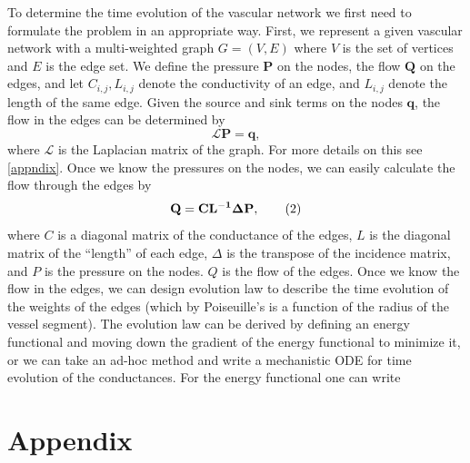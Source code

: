 \documentclass[10pt,a4paper,twocolumn]{article}
\begin{document}
	
	To determine the time evolution of the vascular network we first need to formulate the problem in an appropriate way. First, we represent a given vascular network with a multi-weighted graph $ G=(V,E) $ where $ V $ is the set of vertices and $ E $ is the edge set. We define the pressure $ \mathbf{P} $ on the nodes, the flow $ \mathbf{Q} $ on the edges, and let $ C_{i,j}, L_{i,j} $ denote the conductivity of an edge, and $ L_{i,j} $ denote the length of the same edge. Given the source and sink terms on the nodes $ \mathbf{q} $, the flow in the edges can be determined by
	\[ \mathcal{L} \mathbf{P} = \mathbf{q}, \]
	where $ \mathcal{L} $ is the Laplacian matrix of the graph. For more details on this see \autoref{appndix}. Once we know the pressures on the nodes, we can easily calculate the flow through the edges by 
	\[ \bf{Q} = \bf{C} L^{-1} \bf{\Delta} \bf{P}, \tag{2} \]
	where $ C $ is a diagonal matrix of the conductance of the edges, $ L $ is the diagonal matrix of the ``length'' of each edge, $ \Delta $ is the transpose of the incidence matrix, and $ P $ is the pressure on the nodes. $ Q $ is the flow of the edges. Once we know the flow in the edges, we can design evolution law to describe the time evolution of the weights of the edges (which by Poiseuille's is a function of the radius of the vessel segment). The evolution law can be derived by defining an energy functional and moving down the gradient of the energy functional to minimize it, or we can take an ad-hoc method and write a mechanistic ODE for time evolution of the conductances. For the energy functional one can write
	
	
	
	
	
	 
	
	\appendix
	\clearpage
	\section{Appendix}
	\label{appndix}
	
\end{document}
